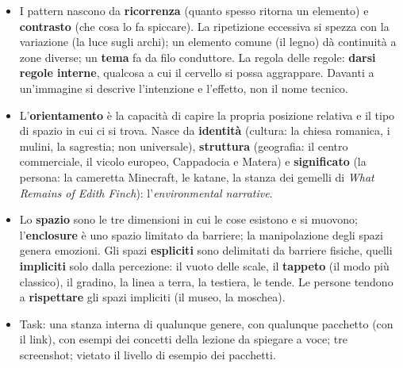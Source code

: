 \begin{itemize}
        stanno con tutto; un colore dominante e degli \textbf{accenti}; le piante come
        pizzico di caos che rende lo spazio reale; la \textbf{simmetria di bilanciamento}
        con elementi diversi che svolgono la stessa funzione visiva.
  \item I pattern nascono da \textbf{ricorrenza} (quanto spesso ritorna un elemento) e
        \textbf{contrasto} (che cosa lo fa spiccare). La ripetizione eccessiva si spezza
        con la variazione (la luce sugli archi); un elemento comune (il legno) dà
        continuità a zone diverse; un \textbf{tema} fa da filo conduttore. La regola delle
        regole: \textbf{darsi regole interne}, qualcosa a cui il cervello si possa
        aggrappare. Davanti a un'immagine si descrive l'intenzione e l'effetto, non il
        nome tecnico.
  \item L'\textbf{orientamento} è la capacità di capire la propria posizione relativa e
        il tipo di spazio in cui ci si trova. Nasce da \textbf{identità} (cultura: la
        chiesa romanica, i mulini, la sagrestia; non universale), \textbf{struttura}
        (geografia: il centro commerciale, il vicolo europeo, Cappadocia e Matera) e
        \textbf{significato} (la persona: la cameretta Minecraft, le katane, la stanza
        dei gemelli di \emph{What Remains of Edith Finch}): l'\emph{environmental
        narrative}.
  \item Lo \textbf{spazio} sono le tre dimensioni in cui le cose esistono e si muovono;
        l'\textbf{enclosure} è uno spazio limitato da barriere; la manipolazione degli
        spazi genera emozioni. Gli spazi \textbf{espliciti} sono delimitati da barriere
        fisiche, quelli \textbf{impliciti} solo dalla percezione: il vuoto delle scale,
        il \textbf{tappeto} (il modo più classico), il gradino, la linea a terra, la
        testiera, le tende. Le persone tendono a \textbf{rispettare} gli spazi impliciti
        (il museo, la moschea).
  \item Task: una stanza interna di qualunque genere, con qualunque pacchetto (con il
        link), con esempi dei concetti della lezione da spiegare a voce; tre screenshot;
        vietato il livello di esempio dei pacchetti.
\end{itemize}
